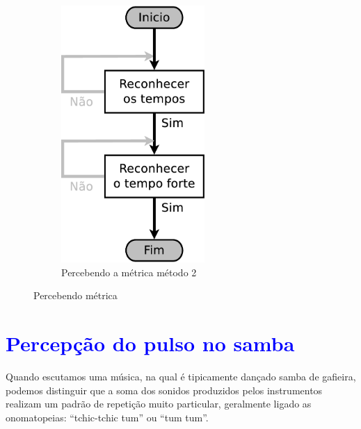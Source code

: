 \begin{figure}[h]
\begin{subfigure}[c]{0.45\textwidth}
\includegraphics[width=0.6\textwidth]{chapters/cap-musicalidade/dancanopulso2.eps}
\caption{Percebendo a métrica método 2}
\label{fig:fluxodancanopulso2}
\end{subfigure}
    \caption{Percebendo métrica}\label{fig:fluxodancanopulso}
\end{figure}


\section{\textcolor{blue}{Percepção do pulso no samba}}
\label{sec:percepcaoouvinte}
Quando escutamos uma música, na qual é tipicamente dançado samba de gafieira,
podemos distinguir que a soma dos sonidos produzidos pelos instrumentos realizam 
um padrão de repetição muito particular, geralmente ligado as onomatopeias: ``tchic-tchic tum'' ou ``tum tum''.


